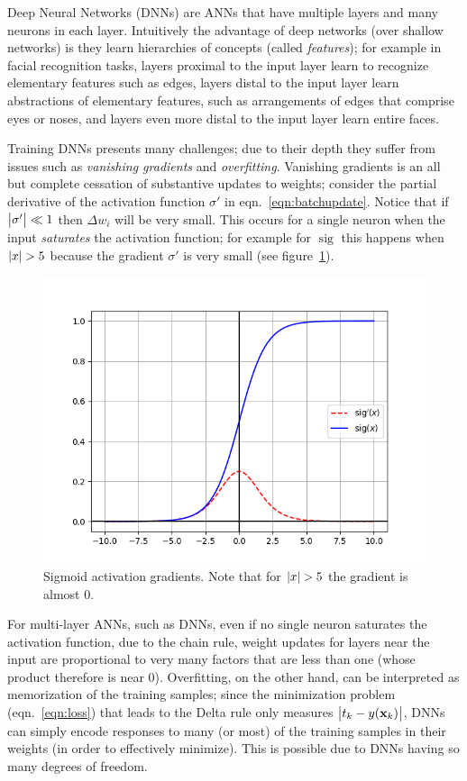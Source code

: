 %
Deep Neural Networks (DNNs) are ANNs that have multiple layers and many neurons in each layer.
%
Intuitively the advantage of deep networks (over shallow networks) is they learn hierarchies of concepts (called \textit{features}); for example in facial recognition tasks, layers proximal to the input layer learn to recognize elementary features such as edges, layers distal to the input layer learn abstractions of elementary features, such as arrangements of edges that comprise eyes or noses, and layers even more distal to the input layer learn entire faces.

Training DNNs presents many challenges; due to their depth they suffer from issues such as \textit{vanishing gradients} and \textit{overfitting}.
%
Vanishing gradients is an all but complete cessation of substantive updates to weights; consider the partial derivative of the activation function \(\sigma'\) in eqn.~\eqref{eqn:batchupdate}.
%
Notice that if \(\abs{\sigma'} \ll 1\) then \(\Delta w_i\) will be very small.
%
This occurs for a single neuron when the input \textit{saturates} the activation function; for example for \(\operatorname{sig}\) this happens when \(\abs{x} > 5\) because the gradient \(\sigma'\) is very small (see figure~\ref{fig:activs}).
\begin{figure}[!htbp]
    \centering
    \includegraphics[width=\linewidth]{figures/neural_networks/activation_grads.png}
    \caption[]{Sigmoid activation gradients. Note that for \(\abs{x} > 5\) the gradient is almost 0.}\label{fig:activs}
\end{figure}
%
For multi-layer ANNs, such as DNNs, even if no single neuron saturates the activation function,
due to the chain rule, weight updates for layers near the input are proportional to very many factors that are less than one (whose product therefore is near 0).
%
Overfitting, on the other hand, can be interpreted as memorization of the training samples; since the minimization problem (eqn.~\eqref{eqn:loss}) that leads to the Delta rule only measures \(\abs{t_k - y(\mathbf{x}_k)}\), DNNs can simply encode responses to many (or most) of the training samples in their weights (in order to effectively minimize). 
%
This is possible due to DNNs having so many degrees of freedom.

